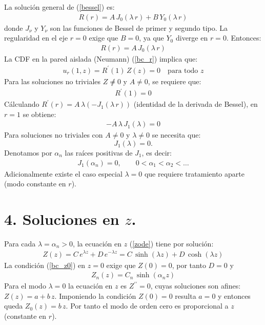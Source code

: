 \documentclass[12pt]{article}
\newcommand{\pderivada}[1]{\ensuremath{{#1}^{\prime}}}
\newcommand{\sderivada}[1]{\ensuremath{{#1}^{\prime \prime}}}
\begin{document}
La solución general de (\ref{bessel}) es:
\begin{align*}
    R (r) = A \, J_{0} (\lambda \, r) + B \, Y_{0} (\lambda \, r)
\end{align*}
donde $J_{\nu}$ y $Y_{\nu}$ son las funciones de Bessel de primer y segundo tipo. La regularidad en el eje $r = 0$ exige que $B = 0$, ya que $Y_{0}$ diverge en $r = 0$. Entonces:
\begin{align*}\label{R}
R (r) = A \, J_{0} (\lambda \, r)
\end{align*}
La CDF en la pared aislada (Neumann) (\ref{bc_r}) implica que:
\begin{align*}
    u_{r} (1, z) = \pderivada{R} (1) \, Z (z) = 0 \quad \text{para todo } z
\end{align*}
Para las soluciones no triviales $Z \not \neq 0$ y $A \neq 0$, se requiere que:
\begin{align*}
    \pderivada{R} (1) = 0
\end{align*}
Cálculando $\pderivada{R} (r) = A \, \lambda (-J_{1} (\lambda \, r))$ (identidad de la derivada de Bessel), en $r = 1$ se obtiene:
\begin{align*}
    -A \, \lambda \, J_{1} (\lambda) = 0
\end{align*}
Para soluciones no triviales con $A \neq 0$ y $\lambda \neq 0$ se necesita que:
\begin{equation}\label{alpha}
J_{1} (\lambda) = 0.
\end{equation}
Denotamos por $\alpha_{n}$ las raíces positivas de $J_{1}$, es decir:
\begin{align*}
    J_{1} (\alpha_{n}) = 0, \qquad 0 < \alpha_{1} < \alpha_{2} < \ldots
\end{align*}
Adicionalmente existe el caso especial $\lambda = 0$ que requiere tratamiento aparte (modo constante en $r$).

\section*{4. Soluciones en $z$.}

Para cada $\lambda = \alpha_{n} > 0$, la ecuación en $z$ (\ref{zode}) tiene por solución:
\begin{align*}
    Z (z) = C \, e^{\lambda z} + D \, e^{-\lambda z} = C \, \sinh(\lambda z) + D \, \cosh(\lambda z)
\end{align*}
La condición (\ref{bc_z0}) en $z = 0$ exige que $Z (0) = 0$, por tanto $D = 0$ y
\begin{align*}
    Z_{n} (z) = C_{n} \, \sinh(\alpha_{n} z)
\end{align*}
Para el modo $\lambda = 0$ la ecuación en $z$ es $\sderivada{Z} = 0$, cuyas soluciones son afines: $Z (z) = a + b \, z$. Imponiendo la condición $Z (0) = 0$ resulta $a = 0$ y entonces queda $Z_{0} (z) = b \, z$. Por tanto el modo de orden cero es proporcional a $z$ (constante en $r$).
\end{document}
